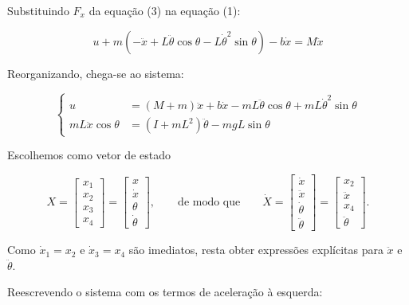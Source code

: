 \documentclass[brazil, 12pt]{article}
\begin{document}
Substituindo $F_x$ da equação (3) na equação (1):

\[
u + m\left(-\ddot{x} + L\ddot{\theta}\cos\theta - L\dot{\theta}^{2}\sin\theta\right) - b\dot{x} = M\ddot{x}
\]

Reorganizando, chega-se ao sistema:

\[
\left\{
\begin{aligned}
u &= (M+m)\ddot{x} + b\dot{x} - mL\ddot{\theta}\cos\theta + mL\dot{\theta}^{2}\sin\theta \\[6pt]
mL\ddot{x}\cos\theta &= \left(I + mL^{2}\right)\ddot{\theta} - mgL\sin\theta
\end{aligned}
\right.
\]

\vspace{0.3cm}


Escolhemos como vetor de estado

\[
X =
\begin{bmatrix}
x_1 \\ x_2 \\ x_3 \\ x_4
\end{bmatrix}
=
\begin{bmatrix}
x \\ \dot{x} \\ \theta \\ \dot{\theta}
\end{bmatrix},
\qquad\text{de modo que}\qquad
\dot{X} =
\begin{bmatrix}
\dot{x} \\ \ddot{x} \\ \dot{\theta} \\ \ddot{\theta}
\end{bmatrix}
=
\begin{bmatrix}
x_2 \\ \ddot{x} \\ x_4 \\ \ddot{\theta}
\end{bmatrix}.
\]

Como $\dot{x}_1 = x_2$ e $\dot{x}_3 = x_4$ são imediatos, resta obter expressões
explícitas para $\ddot{x}$ e $\ddot{\theta}$.


Reescrevendo o sistema com os termos de aceleração à esquerda:
\end{document}
